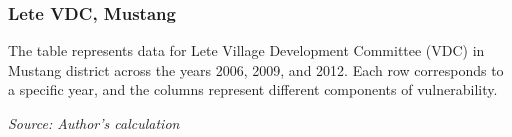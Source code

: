 \subsubsection{Lete VDC, Mustang}
The table represents data for Lete Village Development Committee (VDC) in Mustang district across the years 2006, 2009, and 2012. Each row corresponds to a specific year, and the columns represent different components of vulnerability.
\begin{table}[htb]
	\caption{Mean of the HVI components for Lete VDC, Mustang}
	\textit{Source: Author's calculation}
	\label{tab:hviletecomponents}
\end{table}

